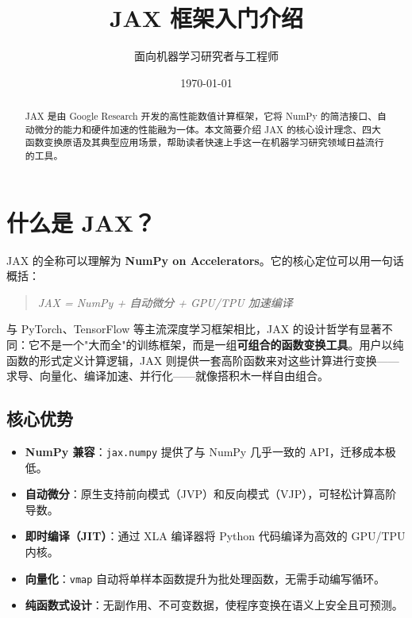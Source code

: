 \documentclass[12pt,a4paper]{article}
\title{\textbf{JAX 框架入门介绍}}
\author{面向机器学习研究者与工程师}
\date{\today}
\begin{document}
\maketitle

\begin{abstract}
JAX 是由 Google Research 开发的高性能数值计算框架，它将 NumPy 的简洁接口、自动微分的能力和硬件加速的性能融为一体。本文简要介绍 JAX 的核心设计理念、四大函数变换原语及其典型应用场景，帮助读者快速上手这一在机器学习研究领域日益流行的工具。
\end{abstract}

\tableofcontents
\newpage

\section{什么是 JAX？}

JAX 的全称可以理解为 \textbf{NumPy on Accelerators}。它的核心定位可以用一句话概括：

\begin{quote}
\emph{JAX = NumPy + 自动微分 + GPU/TPU 加速编译}
\end{quote}

与 PyTorch、TensorFlow 等主流深度学习框架相比，JAX 的设计哲学有显著不同：它不是一个"大而全"的训练框架，而是一组\textbf{可组合的函数变换工具}。用户以纯函数的形式定义计算逻辑，JAX 则提供一套高阶函数来对这些计算进行变换——求导、向量化、编译加速、并行化——就像搭积木一样自由组合。

\subsection{核心优势}

\begin{itemize}
    \item \textbf{NumPy 兼容}：\texttt{jax.numpy} 提供了与 NumPy 几乎一致的 API，迁移成本极低。
    \item \textbf{自动微分}：原生支持前向模式（JVP）和反向模式（VJP），可轻松计算高阶导数。
    \item \textbf{即时编译（JIT）}：通过 XLA 编译器将 Python 代码编译为高效的 GPU/TPU 内核。
    \item \textbf{向量化}：\texttt{vmap} 自动将单样本函数提升为批处理函数，无需手动编写循环。
    \item \textbf{纯函数式设计}：无副作用、不可变数据，使程序变换在语义上安全且可预测。
\end{itemize}
\end{document}
